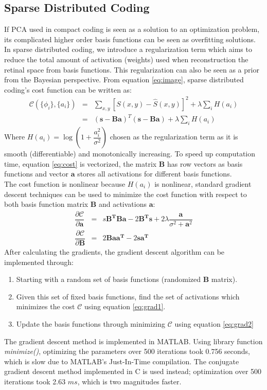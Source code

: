\documentclass[journal]{IEEEtran}
\begin{document}
\subsection{Sparse Distributed Coding}
If PCA used in compact coding is seen as a solution to an optimization problem, its complicated higher order basis functions can be seen as overfitting solutions. In sparse distributed coding, we introduce a regularization term which aims to reduce the total amount of activation (weights) used when reconstruction the retinal space from basis functions. This regularization can also be seen as a prior from the Bayesian perspective. From equation \ref{eq:image}, sparse distributed coding's cost function can be written as:
\begin{eqnarray}
\mathcal{C}(\{\phi_i\},\{a_i\}) &=& \sum_{x,y}[S(x,y) - \hat{S}(x,y)]^2 + \lambda \sum_i H (a_i)\label{eq:cost}
\\
&=& (\bm{s}-\bm{Ba})^T(\bm{s}-\bm{Ba}) + \lambda \sum_i H(a_i)
\label{eq:cost1}
\end{eqnarray}
Where $H(a_i) = \log (1+ \dfrac{a_i^2}{\sigma^2})$ chosen as the regularization term as it is smooth (differentiable) and monotonically increasing. To speed up computation time, equation \ref{eq:cost} is vectorized, the matrix $\bm{B}$ has row vectors as basis functions and vector $\bm{a}$ stores all activations for different basis functions.\\
The cost function is nonlinear because $H(a_i)$ is nonlinear, standard gradient descent techniques can be used to minimize the cost function with respect to both basis function matrix $\bm{B}$ and activations $\bm{a}$:
\begin{eqnarray}
\dfrac{\partial{\mathcal{C}}}{\partial\bm{a}} &=& s \bm{B^T Ba} - 2 \bm{B^T s} + 2\lambda \dfrac{\bm{a}}{\sigma^2 + \bm{a}^2}\label{eq:grad1}\\
\dfrac{\partial{\mathcal{C}}}{\partial\bm{B}} &=& 2\bm{Baa^T} - 2\bm{sa^T}\label{eq:grad2}
\end{eqnarray}
After calculating the gradients, the gradient descent algorithm can be implemented through: \begin{enumerate}
    \item Starting with a random set of basis functions (randomized $\bm{B}$ matrix).
    \item Given this set of fixed basis functions, find the set of activations which minimizes the cost $\mathcal{C}$ using equation \ref{eq:grad1}.
    \item Update the basis functions through minimizing $\mathcal{C}$ using equation \ref{eq:grad2}
\end{enumerate}
The gradient descent method is implemented in MATLAB. Using library function \textit{minimize()}, optimizing the parameters over 500 iterations took 0.756 seconds, which is slow due to MATLAB's Just-In-Time compilation. The conjugate gradient descent method implemented in C is used instead; optimization over 500 iterations took 2.63 $ms$, which is two magnitudes faster. 
\end{document}
